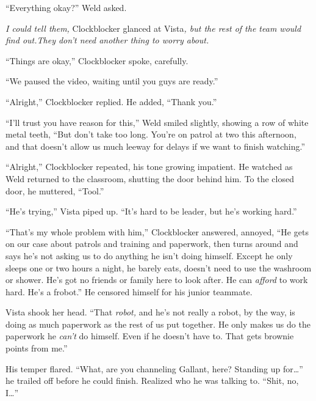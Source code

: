 ``Everything okay?'' Weld asked.



\emph{I could tell them, }Clockblocker glanced at Vista\emph{, but the rest of the team would find out.}\emph{They don't need another thing to worry about.}



``Things are okay,'' Clockblocker spoke, carefully.



``We paused the video, waiting until you guys are ready.''



``Alright,'' Clockblocker replied.  He added, ``Thank you.''



``I'll trust you have reason for this,'' Weld smiled slightly, showing a row of white metal teeth, ``But don't take too long.  You're on patrol at two this afternoon, and that doesn't allow us much leeway for delays if we want to finish watching.''



``Alright,'' Clockblocker repeated, his tone growing impatient.  He watched as Weld returned to the classroom, shutting the door behind him.  To the closed door, he muttered, ``Tool.''



``He's trying,'' Vista piped up.  ``It's hard to be leader, but he's working hard.''



``That's my whole problem with him,'' Clockblocker answered, annoyed, ``He gets on our case about patrols and training and paperwork, then turns around and says he's not asking us to do anything he isn't doing himself.  Except he only sleeps one or two hours a night, he barely eats, doesn't need to use the washroom or shower.  He's got no friends or family here to look after.  He can \emph{afford} to work hard.  He's a f\ldotsrigging robot.''  He censored himself for his junior teammate.



Vista shook her head.  ``That \emph{robot, }and he's not really a robot, by the way, is doing as much paperwork as the rest of us put together.  He only makes us do the paperwork he \emph{can't} do himself.  Even if he doesn't have to.  That gets brownie points from me.''



His temper flared.  ``What, are you channeling Gallant, here?  Standing up for\ldots'' he trailed off before he could finish.  Realized who he was talking to.  ``Shit, no, I\ldots''



